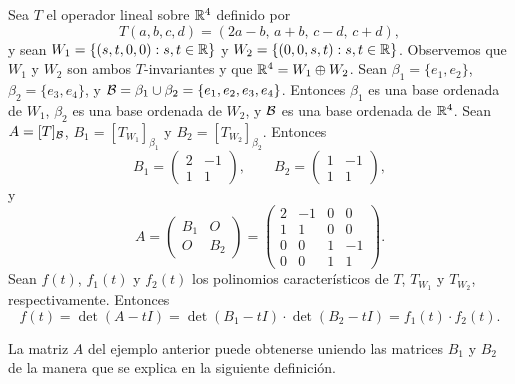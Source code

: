 \documentclass[12pt,a4paper]{book}
\begin{document}
    \begin{ejemplo}
        Sea $T$ el operador lineal sobre $\mathbb{R}^4$ definido por
        \begin{equation*}
            T(a,b,c,d)=(2a-b,\,a+b,\,c-d,\,c+d),
        \end{equation*}
        y sean $W_1=\{(s,t,0,0):s,t\in\mathbb{R}\}$ y $W_2=\{(0,0,s,t):s,t\in\mathbb{R}\}$. Observemos que $W_1$ y $W_2$ son ambos $T$-invariantes y que $\mathbb{R}^4=W_1\oplus W_2$. Sean $\beta_1=\{e_1,e_2\}$, $\beta_2=\{e_3,e_4\}$, y $\mathcal{B}=\beta_1\cup\beta_2=\{e_1,e_2,e_3,e_4\}$. Entonces $\beta_1$ es una base ordenada de $W_1$, $\beta_2$ es una base ordenada de $W_2$, y $\mathcal{B}$ es una base ordenada de $\mathbb{R}^4$. Sean $A=[T]_{\mathcal{B}}$, $B_1=[T_{W_1}]_{\beta_1}$ y $B_2=[T_{W_2}]_{\beta_2}$. Entonces
        \begin{equation*}
            B_1=\begin{pmatrix}2&-1\\1&1\end{pmatrix}, \qquad B_2=\begin{pmatrix}1&-1\\1&1\end{pmatrix},
        \end{equation*}
        y
        \begin{equation*}
            A=\begin{pmatrix}B_1&O\\O&B_2\end{pmatrix}=\begin{pmatrix}2&-1&0&0\\1&1&0&0\\0&0&1&-1\\0&0&1&1\end{pmatrix}.
        \end{equation*}
        Sean $f(t)$, $f_1(t)$ y $f_2(t)$ los polinomios característicos de $T$, $T_{W_1}$ y $T_{W_2}$, respectivamente. Entonces
        \begin{equation*}
            f(t)=\det(A-tI)=\det(B_1-tI)\cdot\det(B_2-tI)=f_1(t)\cdot f_2(t).
        \end{equation*}
    \end{ejemplo}

    La matriz $A$ del ejemplo anterior puede obtenerse uniendo las matrices $B_1$ y $B_2$ de la manera que se explica en la siguiente definición.
\end{document}
